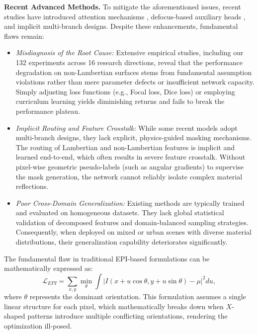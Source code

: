 \textbf{Recent Advanced Methods.} 
To mitigate the aforementioned issues, recent studies have introduced attention mechanisms \cite{wang2021attention}, defocus-based auxiliary heads \cite{huang2021defocus}, and implicit multi-branch designs. Despite these enhancements, fundamental flaws remain:
\begin{itemize}
    \item \textit{Misdiagnosis of the Root Cause:} Extensive empirical studies, including our 132 experiments across 16 research directions, reveal that the performance degradation on non-Lambertian surfaces stems from fundamental assumption violations rather than mere parameter defects or insufficient network capacity. Simply adjusting loss functions (e.g., Focal loss, Dice loss) or employing curriculum learning yields diminishing returns and fails to break the performance plateau.
    \item \textit{Implicit Routing and Feature Crosstalk:} While some recent models adopt multi-branch designs, they lack explicit, physics-guided masking mechanisms. The routing of Lambertian and non-Lambertian features is implicit and learned end-to-end, which often results in severe feature crosstalk. Without pixel-wise geometric pseudo-labels (such as angular gradients) to supervise the mask generation, the network cannot reliably isolate complex material reflections.
    \item \textit{Poor Cross-Domain Generalization:} Existing methods are typically trained and evaluated on homogeneous datasets. They lack global statistical validation of decomposed features and domain-balanced sampling strategies. Consequently, when deployed on mixed or urban scenes with diverse material distributions, their generalization capability deteriorates significantly.
\end{itemize}

The fundamental flaw in traditional EPI-based formulations can be mathematically expressed as:
\begin{equation}
\mathcal{L}_{EPI} = \sum_{x,y} \min_{\theta} \int \left| I(x + u \cos\theta, y + u \sin\theta) - \mu \right|^2 du,
\label{eq:ch1_1}
\end{equation}
where $\theta$ represents the dominant orientation. This formulation assumes a single linear structure for each pixel, which mathematically breaks down when $X$-shaped patterns introduce multiple conflicting orientations, rendering the optimization ill-posed.

